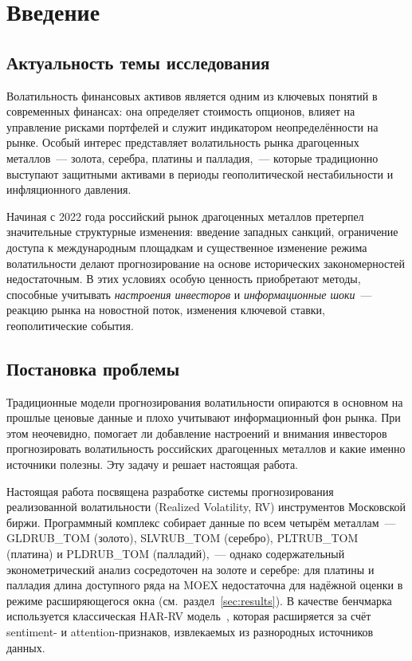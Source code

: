 \section*{Введение}

\subsection*{Актуальность темы исследования}

Волатильность финансовых активов является одним из ключевых понятий в современных финансах:
она определяет стоимость опционов, влияет на управление рисками портфелей и служит
индикатором неопределённости на рынке.
Особый интерес представляет волатильность рынка драгоценных металлов~--- золота, серебра,
платины и палладия,~--- которые традиционно выступают защитными активами в периоды
геополитической нестабильности и инфляционного давления.

Начиная с 2022 года российский рынок драгоценных металлов претерпел значительные структурные
изменения: введение западных санкций, ограничение доступа к международным площадкам и
существенное изменение режима волатильности делают прогнозирование на основе
исторических закономерностей недостаточным.
В этих условиях особую ценность приобретают методы, способные учитывать
\textit{настроения инвесторов} и \textit{информационные шоки}~--- реакцию рынка на
новостной поток, изменения ключевой ставки, геополитические события.

\subsection*{Постановка проблемы}

Традиционные модели прогнозирования волатильности опираются в основном на
прошлые ценовые данные и плохо учитывают информационный фон рынка. При этом
неочевидно, помогает ли добавление настроений и внимания инвесторов
прогнозировать волатильность российских драгоценных металлов и какие именно
источники полезны. Эту задачу и решает настоящая работа.

Настоящая работа посвящена разработке системы прогнозирования реализованной волатильности
(Realized Volatility, RV) инструментов Московской биржи. Программный комплекс собирает
данные по всем четырём металлам~--- GLDRUB\_TOM (золото), SLVRUB\_TOM (серебро),
PLTRUB\_TOM (платина) и PLDRUB\_TOM (палладий),~--- однако содержательный
эконометрический анализ сосредоточен на золоте и серебре: для платины и палладия
длина доступного ряда на MOEX недостаточна для надёжной оценки в режиме
расширяющегося окна (см.\ раздел~\ref{sec:results}).
В качестве бенчмарка используется классическая HAR-RV модель~\cite{Corsi2009},
которая расширяется за счёт sentiment- и attention-признаков,
извлекаемых из разнородных источников данных.

